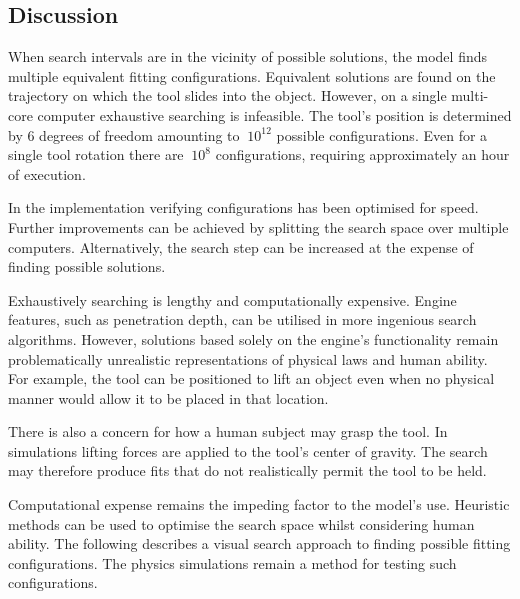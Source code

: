 \documentclass[11]{article}
\begin{document}
\subsection{Discussion}
When search intervals are in the vicinity of possible solutions, the model finds multiple equivalent fitting configurations.
Equivalent solutions are found on the trajectory on which the tool slides into the object.
However, on a single multi-core computer exhaustive searching is infeasible. 
The tool's position is determined by 6 degrees of freedom amounting to $~10^{12}$ possible configurations. 
Even for a single tool rotation there are $~10^8$ configurations, requiring approximately an hour of execution. 

In the implementation verifying configurations has been optimised for speed.
Further improvements can be achieved by splitting the search space over multiple computers.
Alternatively, the search step can be increased at the expense of finding possible solutions. 

Exhaustively searching is lengthy and computationally expensive.
Engine features, such as penetration depth, can be utilised in more ingenious search algorithms.
However, solutions based solely on the engine's functionality remain problematically unrealistic representations of physical laws and human ability.
For example, the tool can be positioned to lift an object even when no physical manner would allow it to be placed in that location.  

There is also a concern for how a human subject may grasp the tool.
In simulations lifting forces are applied to the tool's center of gravity.
The search may therefore produce fits that do not realistically permit the tool to be held.

Computational expense remains the impeding factor to the model's use. 
Heuristic methods can be used to optimise the search space whilst considering human ability.
The following describes a visual search approach to finding possible fitting configurations. 
The physics simulations remain a method for testing such configurations. 

\end{document}
